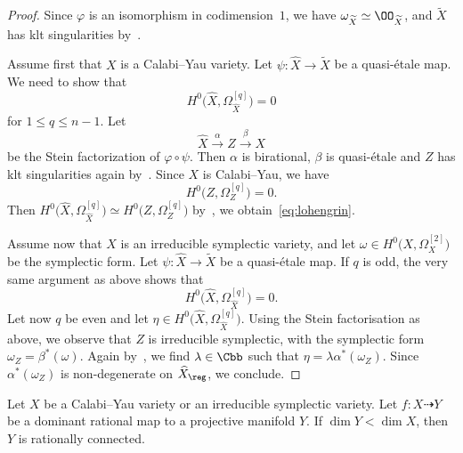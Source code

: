 \begin{proof}
Since $\varphi$ is an isomorphism in codimension~$1$, we have $\omega_{\widetilde X}\simeq \OO_{\widetilde X}$, and $\widetilde X$ has klt singularities by~\cite[Proposition~5.20]{KM98}.

Assume first that $X$ is a Calabi--Yau variety. Let $\psi\colon \widehat X \to \widetilde X$ be a quasi-étale map. We need to show that
\begin{equation}\label{eq:lohengrin}
H^0\big(\widehat X,\Omega^{[q]}_{\widehat X}\big) = 0
\end{equation}
for $1 \leq q \leq n-1$. Let
\[
\widehat X \overset{\alpha}{\longrightarrow} Z \overset{\beta}{\longrightarrow} X
\]
be the Stein factorization of $\varphi\circ\psi$. Then $\alpha$ is birational, $\beta $ is quasi-étale and $Z$ has klt singularities again by~\cite[Proposition~5.20]{KM98}. Since $X$ is Calabi--Yau, we have
\[
H^0\big(Z,\Omega^{[q]}_Z \big) = 0.
\]
Then $H^0\big(\widehat X,\Omega^{[q]}_{\widehat X}\big) \simeq H^0\big(Z,\Omega^{[q]}_Z\big)$ by~\cite[Theorem~1.4]{GKKP11}, we obtain~\eqref{eq:lohengrin}.

Assume now that $X$ is an irreducible symplectic variety, and let $\omega \in H^0\big(X,\Omega^{[2]}_X\big) $ be the symplectic form. Let $\psi\colon \widehat X \to \widetilde X$ be a quasi-étale map. If $q$ is odd, the very same argument as above shows that
\[
H^0\big(\widehat X,\Omega^{[q]}_{\widehat X}\big) = 0.
\]
Let now $q $ be even and let $\eta \in H^0\big(\widehat X,\Omega^{[q]}_{\widehat X}\big)$. Using the Stein factorisation as above, we observe that $Z$ is irreducible symplectic, with the symplectic form $\omega_Z = \beta^*(\omega)$. Again by~\cite[Theorem~1.4]{GKKP11}, we find $\lambda \in \Cbb$ such that $\eta = \lambda\alpha^*(\omega_Z)$. Since $\alpha^*(\omega_Z)$ is non-degenerate on $\widehat X_{\reg}$, we conclude.
\end{proof}

\begin{theo}\label{thm1-1}
Let $X$ be a Calabi--Yau variety or an irreducible symplectic variety. Let $f\colon X \dasharrow Y$ be a dominant rational map to a projective manifold $Y$. If $\dim Y < \dim X$, then $Y$ is rationally connected.
\end{theo}

